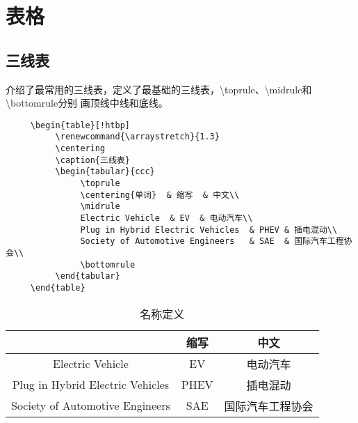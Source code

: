 

\chapter{表格}


\section{三线表}
介绍了最常用的三线表，定义了最基础的三线表，\textcolor{winered}{\textbackslash toprule}、\textcolor{winered}{\textbackslash midrule}和\textcolor{winered}{\textbackslash bottomrule}分别
画顶线中线和底线。

\begin{lstlisting}
     \begin{table}[!htbp]
          \renewcommand{\arraystretch}{1.3}
          \centering
          \caption{三线表}
          \begin{tabular}{ccc}   
               \toprule
               \centering{单词}  & 缩写  & 中文\\    
               \midrule
               Electric Vehicle  & EV  & 电动汽车\\
               Plug in Hybrid Electric Vehicles  & PHEV & 插电混动\\
               Society of Automotive Engineers   & SAE  & 国际汽车工程协会\\
               \bottomrule
          \end{tabular}
     \end{table}
\end{lstlisting}

\begin{table}[!htbp]
     \renewcommand{\arraystretch}{1.3}
     \centering
     \caption{名称定义}
     \begin{tabular}{ccc}   
          \toprule
          \centering{单词}  & 缩写  & 中文\\    
          \midrule
          Electric Vehicle  & EV  & 电动汽车\\
          Plug in Hybrid Electric Vehicles  & PHEV & 插电混动\\
          Society of Automotive Engineers   & SAE  & 国际汽车工程协会\\
          \bottomrule
     \end{tabular}
\end{table}





